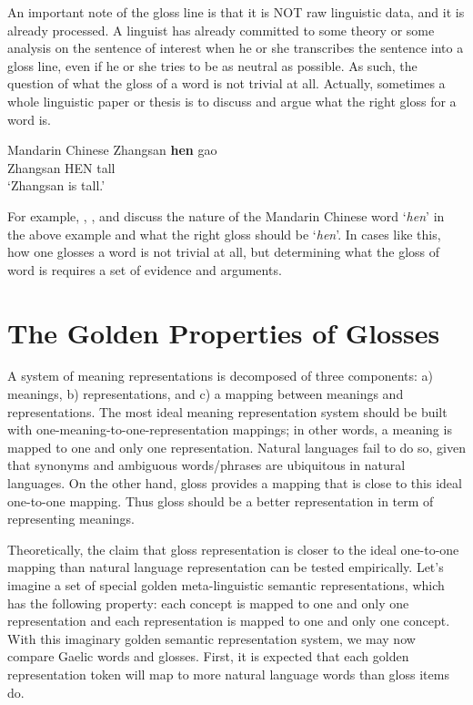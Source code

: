 \documentclass[final]{ua-thesis}
\numberwithin{equation}{section}
\begin{document}
An important note of the gloss line is that it is NOT raw linguistic data, and it is already processed. A linguist has already committed to some theory or some analysis on the sentence of interest when he or she transcribes the sentence into a gloss line, even if he or she tries to be as neutral as possible. As such, the question of what the gloss of a word is not trivial at all. Actually, sometimes a whole linguistic paper or thesis is to discuss and argue what the right gloss for a word is.  

\begin{exe}  
\ex Mandarin Chinese
	\gll   Zhangsan \textbf{hen} gao\\
     	   Zhangsan HEN tall\\
    \glt   `Zhangsan is tall.'  
\end{exe}  

For example, \citet{grano2008mandarin}, \citet{Chen2010}, and \citet{liu2010positive} discuss the nature of the Mandarin Chinese word `\textit{hen}' in the above example and what the right gloss should be `\textit{hen}'. In cases like this, how one glosses a word is not trivial at all, but determining what the gloss of word is requires a set of evidence and arguments. 

\section{The Golden Properties of Glosses}

A system of meaning representations is decomposed of three components: a) meanings, b) representations, and c) a mapping between meanings and representations. The most ideal meaning representation system should be built with one-meaning-to-one-representation mappings; in other words, a meaning is mapped to one and only one representation. Natural languages fail to do so, given that synonyms and ambiguous words/phrases are ubiquitous in natural languages. On the other hand, gloss provides a mapping that is close to this ideal one-to-one mapping. Thus gloss should be a better representation in term of representing meanings. 

Theoretically, the claim that gloss representation is closer to the ideal one-to-one mapping than natural language representation can be tested empirically. 
Let's imagine a set of special golden meta-linguistic semantic representations, which has the following property: each concept is mapped to one and only one representation and each representation is mapped to one and only one concept. With this imaginary golden semantic representation system, we may now compare Gaelic words and glosses. First, it is expected that each golden representation token will map to more natural language words than gloss items do.
\end{document}
